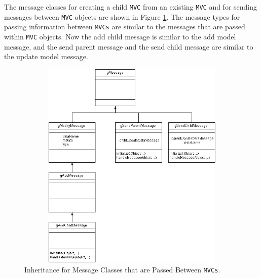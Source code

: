 \documentclass[11pt]{article}
\newcommand{\Robject}[1]{{\texttt{#1}}}
\begin{document}
The message classes for creating a child \Robject{MVC} from an existing
\Robject{MVC} and for sending messages between \Robject{MVC} objects are shown
in Figure \ref{Fig:BetwMess}.  The message types for passing information
between \Robject{MVCs} are similar to the messages
that are passed within \Robject{MVC} objects.  Now the add child message is
similar to the add model message, and the send parent message and the send
child message are similar to the update model message.

\begin{figure}[ht]
  \begin{center}
    \includegraphics[height=4in, width=4.5in]{MVCMessageClass2.jpg}
    \caption{ Inheritance for Message Classes that are Passed Between
      \Robject{MVCs}. }
    \label{Fig:BetwMess}
  \end{center}
\end{figure}
\end{document}
